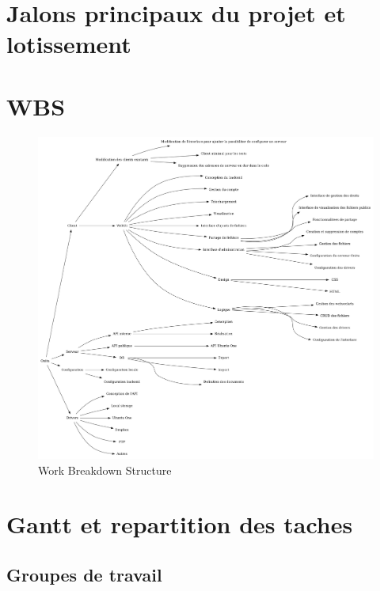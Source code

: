 \section{Jalons principaux du projet et lotissement}


\newpage

\section{WBS}
\begin{figure}[ht]
    \includegraphics[width=\textwidth,height=\textheight,keepaspectratio]{wbs.png}
    \caption{Work Breakdown Structure}
\end{figure}

\section{Gantt et repartition des taches}

\subsection{Groupes de travail}

